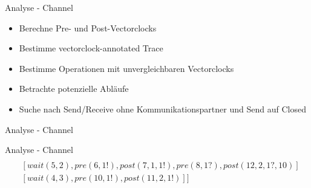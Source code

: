 \documentclass[aspectratio=169]{beamer}  %
\begin{document}
\begin{frame}{Analyse - Channel}
  \begin{itemize}
    \item Berechne Pre- und Post-Vectorclocks
    \item Bestimme vectorclock-annotated Trace
    \item Bestimme Operationen mit unvergleichbaren Vectorclocks
    \item Betrachte potenzielle Abläufe 
    \item Suche nach Send/Receive ohne Kommunikationspartner und Send auf Closed
  \end{itemize}
\end{frame}

\begin{frame}{Analyse - Channel}
    
\end{frame}

\begin{frame}{Analyse - Channel}
  \begin{align*}
    [&[signal(1, 2), signal(2, 3), pre(3, 1?), post(9, 1, 1?, 6)]\\
    &[wait(5, 2), pre(6, 1!), post(7, 1, 1!), pre(8, 1?), post(12, 2, 1?, 10)]\\
    &[wait(4, 3), pre(10, 1!), post(11, 2, 1!)]]
  \end{align*}
\end{frame}
\end{document}
